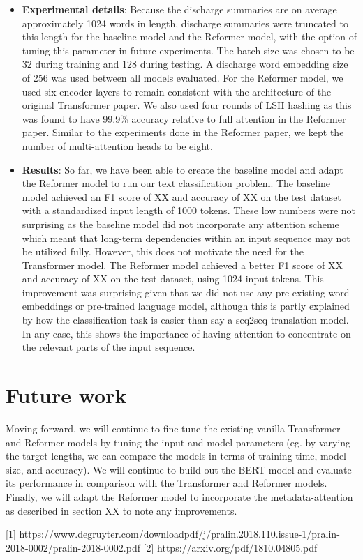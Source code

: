 \documentclass{article}
\begin{document}
\begin{itemize}
    \item \textbf{Experimental details}: Because the discharge summaries are on average approximately 1024 words in length, discharge summaries were truncated to this length for the baseline model and the Reformer model, with the option of tuning this parameter in future experiments. The batch size was chosen to be 32 during training and 128 during testing. A discharge word embedding size of 256 was used between all models evaluated. For the Reformer model, we used six encoder layers to remain consistent with the architecture of the original Transformer paper. We also used four rounds of LSH hashing as this was found to have 99.9\% accuracy relative to full attention in the Reformer paper. Similar to the experiments done in the Reformer paper, we kept the number of multi-attention heads to be eight.  
    \item \textbf{Results}: 
    So far, we have been able to create the baseline model and adapt the Reformer model to run our text classification problem. The baseline model achieved an F1 score of XX and accuracy of XX on the test dataset with a standardized input length of 1000 tokens. These low numbers were not surprising as the baseline model did not incorporate any attention scheme which meant that long-term dependencies within an input sequence may not be utilized fully. However, this does not motivate the need for the Transformer model. The Reformer model achieved a better F1 score of XX and accuracy of XX on the test dataset, using 1024 input tokens. This improvement was surprising given that we did not use any pre-existing word embeddings or pre-trained language model, although this is partly explained by how the classification task is easier than say a seq2seq translation model. In any case, this shows the importance of having attention to concentrate on the relevant parts of the input sequence.
\end{itemize}


\section{Future work}
	Moving forward, we will continue to fine-tune the existing vanilla Transformer and Reformer models by tuning the input and model parameters (eg. by varying the target lengths, we can compare the models in terms of training time, model size, and accuracy). We will continue to build out the BERT model and evaluate its performance in comparison with the Transformer and Reformer models. Finally, we will adapt the Reformer model to incorporate the metadata-attention as described in section XX to note any improvements. 





[1] https://www.degruyter.com/downloadpdf/j/pralin.2018.110.issue-1/pralin-2018-0002/pralin-2018-0002.pdf
[2] https://arxiv.org/pdf/1810.04805.pdf
\end{document}
